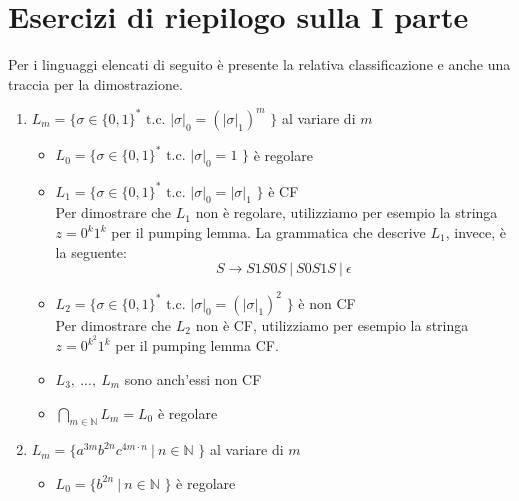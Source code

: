 \documentclass[a4paper,oneside,titlepage]{book}
\begin{document}
\section{Esercizi di riepilogo sulla I parte}
Per i linguaggi elencati di seguito è presente la relativa classificazione e anche una traccia per la dimostrazione.
\begin{enumerate}[label=\fbox{\arabic*}]
\item $L_m = \text{\{ } \sigma \in \{0,1\}^* \text{ t.c. } |\sigma|_0 = (|\sigma|_1)^m \text{ \}}$ al variare di $m$
\begin{itemize}
\item $L_0 = \text{\{ } \sigma \in \{0,1\}^* \text{ t.c. } |\sigma|_0 = 1 \text{ \}}$ è regolare
\begin{center}
\end{center}

\item $L_1 = \text{\{ } \sigma \in \{0,1\}^* \text{ t.c. } |\sigma|_0 = |\sigma|_1 \text{ \}}$ è CF
\\ Per dimostrare che $L_1$ non è regolare, utilizziamo per esempio la stringa $z = 0^k 1^k$ per il pumping lemma. La grammatica che descrive $L_1$, invece, è la seguente:
\[ S \longrightarrow S1S0S \ | \  S0S1S \ | \  \epsilon \]

\item $L_2 = \text{\{ } \sigma \in \{0,1\}^* \text{ t.c. } |\sigma|_0 = (|\sigma|_1)^2 \text{ \}}$ è non CF
\\ Per dimostrare che $L_2$ non è CF, utilizziamo per esempio la stringa $z = 0^{k^2} 1^k$ per il pumping lemma CF.

\item $L_3, \ ..., \ L_m$ sono anch'essi non CF

\item $\bigcap_{m \in \mathbb{N}} L_m = L_0$ è regolare
\end{itemize}

\item $L_m = \text{\{ } a^{3m} b^{2n} c^{4m \cdot n} \ | \  n \in \mathbb{N} \text{ \}}$ al variare di $m$
\begin{itemize}
\item $L_0 = \text{\{ } b^{2n} \ | \  n \in \mathbb{N} \text{ \}}$ è regolare
\begin{center}
\end{center}
\end{itemize}
\end{enumerate}
\end{document}
